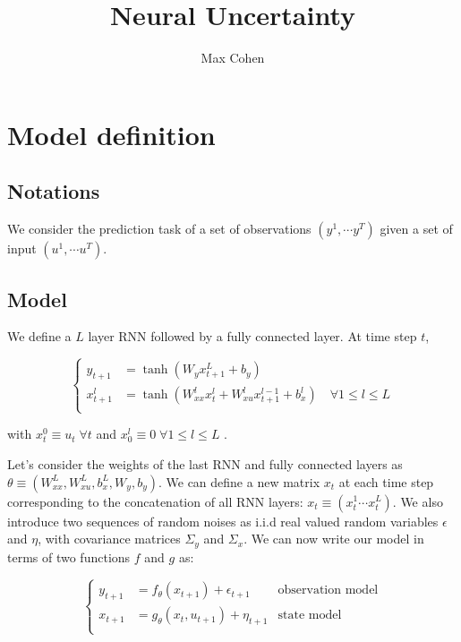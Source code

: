 \documentclass[10pt,a4paper]{report}
\begin{document}
\title{Neural Uncertainty}
\author{Max Cohen}

\chapter{Model definition}
\section{Notations}
We consider the prediction task of a set of observations $(y^1, \cdots y^T)$ given a set of input $(u^1, \cdots u^T)$.

\section{Model}
We define a $L$ layer RNN followed by a fully connected layer. At time step $t$,

\begin{equation*}
    \left\{
    \begin{aligned}
        y_{t+1}   & = \tanh(W_y x_{t+1}^L + b_y)                                                               \\
        x_{t+1}^l & = \tanh(W_{xx}^l x^{l}_{t} + W_{xu}^l x^{l-1}_{t+1} + b_x^l) \quad \forall 1 \leq l \leq L \\
    \end{aligned}
    \right.
\end{equation*}

with $x_{t}^0 \equiv u_{t} \; \forall t$ and $x_{0}^l \equiv 0 \; \forall 1 \leq l \leq L$ .

Let's consider the weights of the last RNN and fully connected layers as $\theta \equiv (W_{xx}^L, W_{xu}^L, b_x^L, W_y, b_y)$.
We can define a new matrix $x_t$ at each time step corresponding to the concatenation of all RNN layers: $x_t \equiv (x_t^1 \cdots x_t^L)$.
We also introduce two sequences of random noises as i.i.d real valued random variables $\epsilon$ and $\eta$, with covariance matrices $\Sigma_y$ and $\Sigma_x$.
We can now write our model in terms of two functions $f$ and $g$ as:

\begin{equation}
    \left\{
    \begin{aligned}
        y_{t+1} & = f_\theta(x_{t+1}) + \epsilon_{t+1}    & \text{observation model} \\
        x_{t+1} & = g_\theta(x_{t}, u_{t+1}) + \eta_{t+1} & \text{state model}       \\
    \end{aligned}
    \right.
\end{equation}
\end{document}
